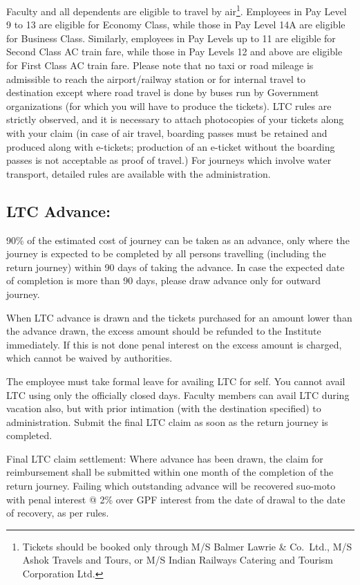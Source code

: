\documentclass[
  10pt,
  a5paper,
  10pt,
  openany]{amsbook}
\begin{document}
Faculty and all dependents are eligible to travel by air\footnote{Tickets
  should be booked only through M/S Balmer Lawrie \& Co.~Ltd., M/S Ashok
  Travels and Tours, or M/S Indian Railways Catering and Tourism
  Corporation Ltd.}. Employees in Pay Level 9 to 13 are eligible for
Economy Class, while those in Pay Level 14A are eligible for Business
Class. Similarly, employees in Pay Levels up to 11 are eligible for
Second Class AC train fare, while those in Pay Levels 12 and above are
eligible for First Class AC train fare. Please note that no taxi or road
mileage is admissible to reach the airport/railway station or for
internal travel to destination except where road travel is done by buses
run by Government organizations (for which you will have to produce the
tickets). LTC rules are strictly observed, and it is necessary to attach
photocopies of your tickets along with your claim (in case of air
travel, boarding passes must be retained and produced along with
e-tickets; production of an e-ticket without the boarding passes is not
acceptable as proof of travel.) For journeys which involve water
transport, detailed rules are available with the administration.

\subsection{LTC Advance:}\label{ltc-advance}

90\% of the estimated cost of journey can be taken as an advance, only
where the journey is expected to be completed by all persons travelling
(including the return journey) within 90 days of taking the advance. In
case the expected date of completion is more than 90 days, please draw
advance only for outward journey.

When LTC advance is drawn and the tickets purchased for an amount lower
than the advance drawn, the excess amount should be refunded to the
Institute immediately. If this is not done penal interest on the excess
amount is charged, which cannot be waived by authorities.

The employee must take formal leave for availing LTC for self. You
cannot avail LTC using only the officially closed days. Faculty members
can avail LTC during vacation also, but with prior intimation (with the
destination specified) to administration. Submit the final LTC claim as
soon as the return journey is completed.

Final LTC claim settlement: Where advance has been drawn, the claim for
reimbursement shall be submitted within one month of the completion of
the return journey. Failing which outstanding advance will be recovered
suo-moto with penal interest @ 2\% over GPF interest from the date of
drawal to the date of recovery, as per rules.
\end{document}
